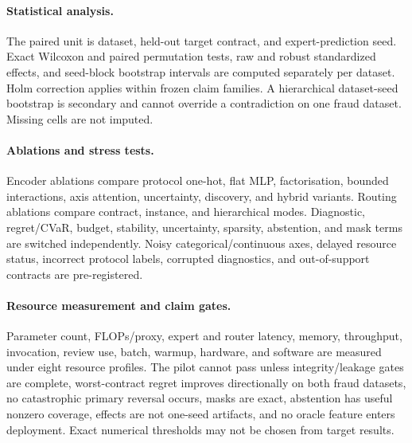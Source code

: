 \paragraph{Statistical analysis.}
The paired unit is dataset, held-out target contract, and expert-prediction seed. Exact Wilcoxon and paired permutation tests, raw and robust standardized effects, and seed-block bootstrap intervals are computed separately per dataset. Holm correction applies within frozen claim families. A hierarchical dataset-seed bootstrap is secondary and cannot override a contradiction on one fraud dataset. Missing cells are not imputed.

\paragraph{Ablations and stress tests.}
Encoder ablations compare protocol one-hot, flat MLP, factorisation, bounded interactions, axis attention, uncertainty, discovery, and hybrid variants. Routing ablations compare contract, instance, and hierarchical modes. Diagnostic, regret/CVaR, budget, stability, uncertainty, sparsity, abstention, and mask terms are switched independently. Noisy categorical/continuous axes, delayed resource status, incorrect protocol labels, corrupted diagnostics, and out-of-support contracts are pre-registered.

\paragraph{Resource measurement and claim gates.}
Parameter count, FLOPs/proxy, expert and router latency, memory, throughput, invocation, review use, batch, warmup, hardware, and software are measured under eight resource profiles. The pilot cannot pass unless integrity/leakage gates are complete, worst-contract regret improves directionally on both fraud datasets, no catastrophic primary reversal occurs, masks are exact, abstention has useful nonzero coverage, effects are not one-seed artifacts, and no oracle feature enters deployment. Exact numerical thresholds may not be chosen from target results.
